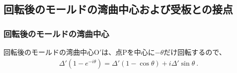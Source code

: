 \subsection{回転後のモールドの湾曲中心および受板との接点}


\subsubsection{回転後のモールドの湾曲中心}
回転後のモールドの湾曲中心O$'$は、点Pを中心に$-\theta$だけ回転するので、
\begin{align*}
  \varDelta'\!\left(1-e^{-i\theta}\right) = \varDelta'(1-\cos\theta)+i\varDelta'\sin\theta\ .
\end{align*}


